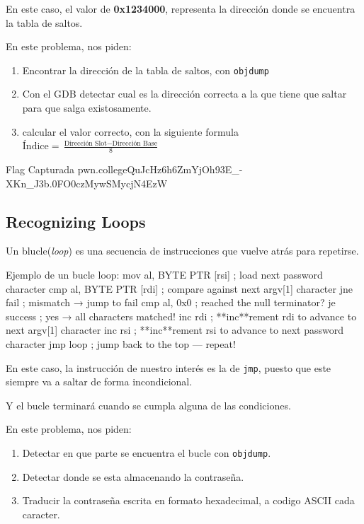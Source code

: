 En este caso, el valor de \textbf{0x1234000}, representa la dirección donde se encuentra la
tabla de saltos.

En este problema, nos piden:
\begin{enumerate}
	\item Encontrar la dirección de la tabla de saltos, con \texttt{objdump}
	\item Con el GDB detectar cual es la dirección correcta a la que tiene que saltar para que salga existosamente.
	\item calcular el valor correcto, con la siguiente formula \( \text{Índice} = \frac{\text{Dirección Slot}-\text{Dirección Base}}{8} \)
\end{enumerate}
\begin{flagbox}{Flag Capturada}
	pwn.college{QuJcHz6h6ZmYjOh93E_-XKn_J3b.0FO0czMywSMycjN4EzW}
\end{flagbox}

\subsection{Recognizing Loops} \label{subsec:recognizing_loops}

Un blucle(\textit{loop}) es una secuencia de instrucciones que vuelve atrás para repetirse.

\begin{codebox}[ASM]{Ejemplo de un bucle}
	loop:
	mov    al, BYTE PTR [rsi]       ; load next password character
	cmp    al, BYTE PTR [rdi]       ; compare against next argv[1] character
	jne    fail                     ; mismatch → jump to fail
	cmp    al, 0x0                  ; reached the null terminator?
	je     success                  ; yes → all characters matched!
	inc    rdi                      ; **inc**rement rdi to advance to next argv[1] character
	inc    rsi                      ; **inc**rement rsi to advance to next password character
	jmp    loop                     ; jump back to the top — repeat!
\end{codebox}

En este caso, la instrucción de nuestro interés es la de \texttt{jmp}, puesto que
este siempre va a saltar de forma incondicional.

Y el bucle terminará cuando se cumpla alguna de las condiciones.

En este problema, nos piden:
\begin{enumerate}
	\item Detectar en que parte se encuentra el bucle con \texttt{objdump}.
	\item Detectar donde se esta almacenando la contraseña.
	\item Traducir la contraseña escrita en formato hexadecimal, a codigo ASCII cada caracter.
\end{enumerate}

